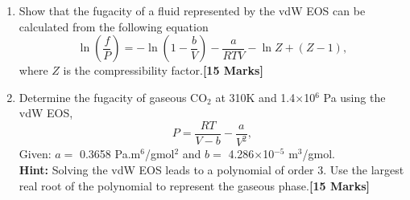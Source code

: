 \documentclass[12pts,a4paper,amsmath,amssymb,floatfix]{article}%
\newcommand{\frc}{\displaystyle\frac}
\begin{document}
\begin{enumerate}[label=\bfseries Problem \arabic*]
\begin{enumerate}
        \item Show that the fugacity of a fluid represented by the vdW EOS can be calculated from the following equation
           \begin{displaymath}
             \ln\left(\frc{f}{P}\right) = -\ln\left(1-\frc{b}{V}\right) - \frc{a}{RTV} - \ln Z + \left(Z - 1\right),
           \end{displaymath}
           where $Z$ is the compressibility factor.\hfill{\bf [15 Marks]}
        \item Determine the fugacity of gaseous CO$_{2}$ at 310K and 1.4$\times$10$^{6}$ Pa using the vdW  EOS,
               \begin{displaymath}
                  P = \frc{RT}{V-b} - \frc{a}{V^{2}},
               \end{displaymath}
               Given: $a=$ 0.3658 Pa.m$^{6}$/gmol$^{2}$ and $b=$ 4.286$\times$10$^{-5}$ m$^{3}$/gmol.  \\
{\bf Hint:} Solving the vdW EOS leads to a polynomial of order 3. Use the largest real root of the polynomial to represent the gaseous phase.\hfill{\bf [15 Marks]}
     \end{enumerate}

\bigskip 


\end{enumerate}
\end{document}
